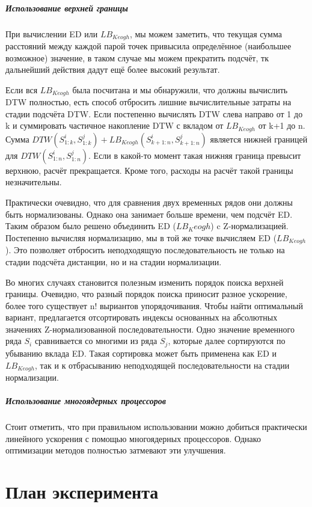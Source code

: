 \documentclass[12pt,twoside]{article}
\begin{document}
        \subparagraph{Использование верхней границы}
        При вычислении ED или $LB_{Keogh}$, мы можем заметить,
        что текущая сумма расстояний между каждой парой точек привысила определённое (наибольшее возможное) значение,
        в таком случае мы можем прекратить подсчёт, тк дальнейший действия дадут ещё более высокий результат.
        
        Если вся $LB_{Keogh}$ была посчитана и мы обнаружили, что должны вычислить DTW полностью,
        есть способ отбросить лишние вычислительные затраты на стадии подсчёта DTW.
        Если постепенно вычислять DTW слева направо от 1 до k и суммировать частичное накопление DTW с вкладом от $LB_{Keogh}$ от k+1 до n.
        Сумма $DTW(S_{1:k}^i, S_{1:k}^j) + LB_{Keogh}(S_{k+1:n}^i, S_{k+1:n}^j)$ является нижней границей для $DTW(S_{1:n}^i, S_{1:n}^j)$.
        Если в какой-то момент такая нижняя граница превысит верхнюю, расчёт прекращается.
        Кроме того, расходы на расчёт такой границы незначительны.
        
        Практически очевидно, что для сравнения двух временных рядов они должны быть нормализованы.
        Однако она занимает больше времени, чем подсчёт ED. Таким образом было решено объединить ED ($LB_Keogh$) c Z-нормализацией.
        Постепенно вычисляя нормализацию, мы в той же точке вычисляем ED ($LB_{Keogh}$).
        Это позволяет отбросить неподходящую последовательность не только на стадии подсчёта дистанции, но и на стадии нормализации.
        
        Во многих случаях становится полезным изменить порядок поиска верхней границы.
        Очевидно, что разный порядок поиска приносит разное ускорение, более того существует n! выриантов упорядочивания.
        Чтобы найти оптимальный вариант, предлагается отсортировать индексы основанных на абсолютных значениях Z-нормализованной последовательности.
        Одно значение временного ряда $S_i$ сравнивается со многими из ряда $S_j$, которые далее сортируются по убыванию вклада ED. 
        Такая сортировка может быть применена как ED и $LB_{Keogh}$, так и к отбрасыванию неподходящей последовательности на стадии нормализации.
                
        \subparagraph{Использование многоядерных процессоров}
        Стоит отметить, что при правильном использовании можно добиться практически линейного ускорения с помощью многоядерных процессоров.
        Однако оптимизации методов полностью затмевают эти улучшения.
				
    \section{План эксперимента}
\end{document}
